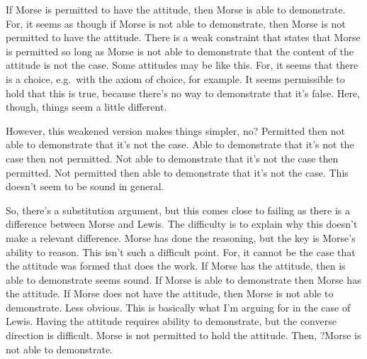 \documentclass[10pt]{article}
\begin{document}
If Morse is permitted to have the attitude, then Morse is able to demonstrate.
For, it seems as though if Morse is not able to demonstrate, then Morse is not permitted to have the attitude.
There is a weak constraint that states that Morse is permitted so long as Morse is not able to demonstrate that the content of the attitude is not the case.
Some attitudes may be like this.
For, it seems that there is a choice, e.g.\ with the axiom of choice, for example.
It seems permissible to hold that this is true, because there's no way to demonstrate that it's false.
Here, though, things seem a little different.

However, this weakened version makes things simpler, no?
Permitted then not able to demonstrate that it's not the case.
Able to demonstrate that it's not the case then not permitted.
Not able to demonstrate that it's not the case then permitted.
Not permitted then able to demonstrate that it's not the case.
This doesn't seem to be sound in general.

So, there's a substitution argument, but this comes close to failing as there is a difference between Morse and Lewis.
The difficulty is to explain why this doesn't make a relevant difference.
Morse has done the reasoning, but the key is Morse's ability to reason.
This isn't such a difficult point.
For, it cannot be the case that the attitude was formed that does the work.
If Morse has the attitude, then is able to demonstrate seems sound.
If Morse is able to demonstrate then Morse has the attitude.
If Morse does not have the attitude, then Morse is not able to demonstrate.
Less obvious.
This is basically what I'm arguing for in the case of Lewis.
Having the attitude requires ability to demonstrate, but the converse direction is difficult.
Morse is not permitted to hold the attitude.
Then, ?Morse is not able to demonstrate.

\newpage
\end{document}
